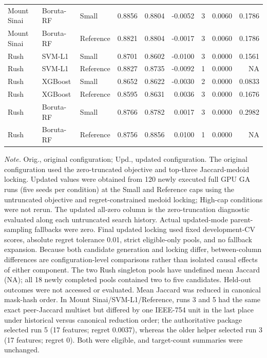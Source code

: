 \begin{table}[H]
{\begin{tabular}{lllrrrrrr}
Mount Sinai & Boruta-RF & Small & 0.8856 & 0.8804 & -0.0052 & 3 & 0.0060 & 0.1786 \\
Mount Sinai & Boruta-RF & Reference & 0.8821 & 0.8804 & -0.0017 & 3 & 0.0060 & 0.1786 \\
\addlinespace[2pt]
Rush & SVM-L1 & Small & 0.8701 & 0.8602 & -0.0100 & 3 & 0.0000 & 0.1561 \\
Rush & SVM-L1 & Reference & 0.8827 & 0.8735 & -0.0092 & 1 & 0.0000 & NA \\
Rush & XGBoost & Small & 0.8652 & 0.8622 & -0.0030 & 2 & 0.0000 & 0.0833 \\
Rush & XGBoost & Reference & 0.8595 & 0.8631 & 0.0036 & 3 & 0.0000 & 0.1676 \\
Rush & Boruta-RF & Small & 0.8766 & 0.8782 & 0.0017 & 3 & 0.0000 & 0.2982 \\
Rush & Boruta-RF & Reference & 0.8756 & 0.8856 & 0.0100 & 1 & 0.0000 & NA \\
\bottomrule
\end{tabular}}
\vspace{0.55em}
\parbox{0.98\linewidth}{\scriptsize\textit{Note.} Orig., original configuration; Upd., updated configuration. The original configuration used the zero-truncated objective and top-three Jaccard-medoid locking. Updated values were obtained from 120 newly executed full GPU GA runs (five seeds per condition) at the Small and Reference caps using the untruncated objective and regret-constrained medoid locking; High-cap conditions were not rerun. The updated all-zero column is the zero-truncation diagnostic evaluated along each untruncated search history. Actual updated-mode parent-sampling fallbacks were zero. Final updated locking used fixed development-CV scores, absolute regret tolerance 0.01, strict eligible-only pools, and no fallback expansion. Because both candidate generation and locking differ, between-column differences are configuration-level comparisons rather than isolated causal effects of either component. The two Rush singleton pools have undefined mean Jaccard (NA); all 18 newly completed pools contained two to five candidates. Held-out outcomes were not accessed or evaluated. Mean Jaccard was reduced in canonical mask-hash order. In Mount Sinai/SVM-L1/Reference, runs 3 and 5 had the same exact peer-Jaccard multiset but differed by one IEEE-754 unit in the last place under historical versus canonical reduction order; the authoritative package selected run 5 (17 features; regret 0.0037), whereas the older helper selected run 3 (17 features; regret 0). Both were eligible, and target-count summaries were unchanged.}
\end{table}
